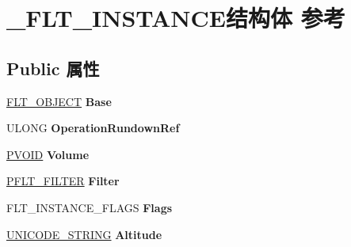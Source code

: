 \hypertarget{struct___f_l_t___i_n_s_t_a_n_c_e}{}\section{\+\_\+\+F\+L\+T\+\_\+\+I\+N\+S\+T\+A\+N\+C\+E结构体 参考}
\label{struct___f_l_t___i_n_s_t_a_n_c_e}
\subsection*{Public 属性}
\begin{DoxyCompactItemize}
\item 
\mbox{\label{struct___f_l_t___i_n_s_t_a_n_c_e_ad11bcdeeb11934a49b0089a4a0119cec}} 
\hyperlink{struct___f_l_t___o_b_j_e_c_t}{F\+L\+T\+\_\+\+O\+B\+J\+E\+CT} {\bfseries Base}
\item 
\mbox{\label{struct___f_l_t___i_n_s_t_a_n_c_e_afe20b628f451c2d47bfcdf20e1b55de3}} 
U\+L\+O\+NG {\bfseries Operation\+Rundown\+Ref}
\item 
\mbox{\label{struct___f_l_t___i_n_s_t_a_n_c_e_ac74db8c5d8d49b8f7bd00bcd7c74156b}} 
\hyperlink{interfacevoid}{P\+V\+O\+ID} {\bfseries Volume}
\item 
\mbox{\label{struct___f_l_t___i_n_s_t_a_n_c_e_ad42f4038f3adcf1c142a8d95047f3f12}} 
\hyperlink{struct___f_l_t___f_i_l_t_e_r}{P\+F\+L\+T\+\_\+\+F\+I\+L\+T\+ER} {\bfseries Filter}
\item 
\mbox{\label{struct___f_l_t___i_n_s_t_a_n_c_e_af05040730a0e359d5c7aadcf340e5c84}} 
F\+L\+T\+\_\+\+I\+N\+S\+T\+A\+N\+C\+E\+\_\+\+F\+L\+A\+GS {\bfseries Flags}
\item 
\mbox{\label{struct___f_l_t___i_n_s_t_a_n_c_e_aa357364690c341d7f10aa39f9d451dc9}} 
\hyperlink{struct___u_n_i_c_o_d_e___s_t_r_i_n_g}{U\+N\+I\+C\+O\+D\+E\+\_\+\+S\+T\+R\+I\+NG} {\bfseries Altitude}
\item 
\mbox{\label{struct___f_l_t___i_n_s_t_a_n_c_e_ad580ac350c8b6b536be59d54041518da}} 

\end{DoxyCompactItemize}
